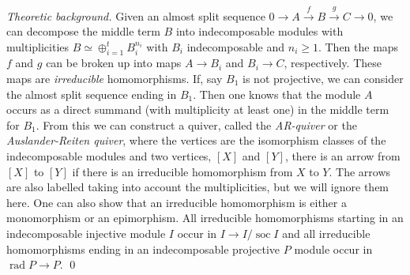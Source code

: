 \documentclass{amsart}
\newcommand{\rad}{\operatorname{rad}\nolimits}
\newcommand{\soc}{\operatorname{soc}\nolimits}
\theoremstyle{definition}
\theoremstyle{theoretic}
\newenvironment{theoback}
{\medskip\small\textit{Theoretic background.} }
{\qed\par\medskip}
\begin{document}
\begin{theoback}
  Given an almost split sequence $0\to A\xrightarrow{f}
  B\xrightarrow{g} C\to 0$, we can decompose the middle term $B$ into
  indecomposable modules with multiplicities $B \simeq \oplus_{i=1}^t
  B_i^{n_i}$ with $B_i$ indecomposable and $n_i\geqslant 1$.  Then the
  maps $f$ and $g$ can be broken up into maps $A\to B_i$ and $B_i\to
  C$, respectively.  These maps are \emph{irreducible} homomorphisms.
  If, say $B_1$ is not projective, we can consider the almost split
  sequence ending in $B_1$.  Then one knows that the module $A$ occurs
  as a direct summand (with multiplicity at least one) in the middle
  term for $B_1$.  From this we can construct a quiver, called the
  \emph{AR-quiver} or the \emph{Auslander-Reiten quiver}, where the
  vertices are the isomorphism classes of the indecomposable modules
  and two vertices, $[X]$ and $[Y]$, there is an arrow from $[X]$ to
  $[Y]$ if there is an irreducible homomorphism from $X$ to $Y$.  The
  arrows are also labelled taking into account the multiplicities, but
  we will ignore them here.  One can also show that an irreducible
  homomorphism is either a monomorphism or an epimorphism.  All
  irreducible homomorphisms starting in an indecomposable injective
  module $I$ occur in $I\to I/\soc I$ and all irreducible
  homomorphisms ending in an indecomposable projective $P$ module
  occur in $\rad P\to P$.
\end{theoback}
\end{document}
